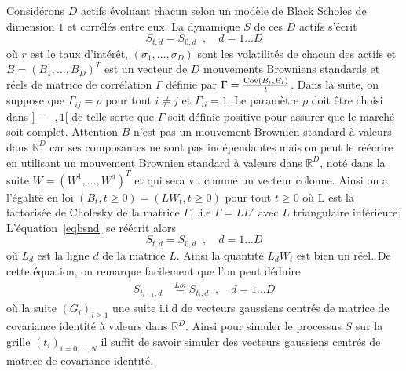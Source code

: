 \documentclass[a4paper,11pt]{article}
\def\R{{\mathbb R}}
\def\Cov{\mathop{\rm Cov}\nolimits}
\def\inv#1{\mathop{\frac{1}{ #1}}\nolimits}
\def\expp#1{\mathop {\mathrm{e}^{ #1}}}
\begin{document}
Considérons $D$ actifs évoluant chacun selon un modèle de Black Scholes de dimension $1$ et corrélés entre eux. La dynamique $S$ de ces $D$ actifs s'écrit
\begin{equation}
  \label{eqbsnd}
  S_{t,d} = S_{0,d} \expp{(r- {(\sigma_d)}^2/2) t + \sigma_d B_{t,d}}, \quad d=1\dots D
\end{equation}
où  $r$ est le taux d'intérêt, $(\sigma_1, \dots, \sigma_D)$ sont les volatilités de chacun des actifs et $B = (B_1, \dots, B_D)^T$ est un vecteur de $D$ mouvements Browniens standards et réels de matrice de corrélation $\Gamma$ définie par $\Gamma = \frac{\Cov(B_t, B_t)}{t}$. Dans la suite, on suppose que $\Gamma_{ij} = \rho$ pour tout $i \neq j$ et $\Gamma_{ii} = 1$. Le paramètre $\rho$ doit être choisi dans $]-\inv{D-1}, 1[$ de telle sorte que $\Gamma$ soit définie positive pour assurer que le marché soit complet.  Attention $B$ n'est pas un mouvement Brownien standard à valeurs dans $\R^D$ car ses composantes ne sont pas indépendantes mais on peut le réécrire en utilisant un mouvement Brownien standard à valeurs dans $\R^D$, noté dans la suite $W = (W^1, \dots, W^d)^T$ et qui sera vu comme un vecteur colonne. Ainsi on a l'égalité en loi $(B_t, t \ge 0) = (L W_t, t \ge 0)$ pour tout $t \ge 0$ où L est la factorisée de Cholesky de la matrice $\Gamma$, .i.e $\Gamma = LL'$ avec $L$ triangulaire
inférieure. L'équation~\eqref{eqbsnd} se réécrit alors
\begin{equation*}
  S_{t,d} = S_{0,d} \expp{(r- {(\sigma_d)}^2/2) t + \sigma_d L_d W_t}, \quad d=1\dots D
\end{equation*}
où $L_d$ est la ligne $d$ de la matrice $L$. Ainsi la quantité $L_d W_t$ est bien un réel.  De cette équation, on remarque facilement que l'on peut déduire
\begin{align*}
  S_{t_{i+1},d} & \stackrel{Loi}{=} S_{t_i,d} \expp{(r- {(\sigma_d)}^2/2)
  (t_{i+1} - t_i) + \sigma_d \sqrt{(t_{i+1} - t_i)}L_d G_{i+1}}, \quad d=1\dots D
\end{align*}
où la suite $(G_i)_{i \ge 1}$ une suite i.i.d de vecteurs gaussiens centrés de matrice de covariance identité à valeurs dans $\R^D$. Ainsi pour simuler le processus $S$ sur la grille $(t_i)_{i=0,\dots,N}$ il suffit de savoir simuler des vecteurs gaussiens centrés de matrice de covariance identité. \\
\end{document}
